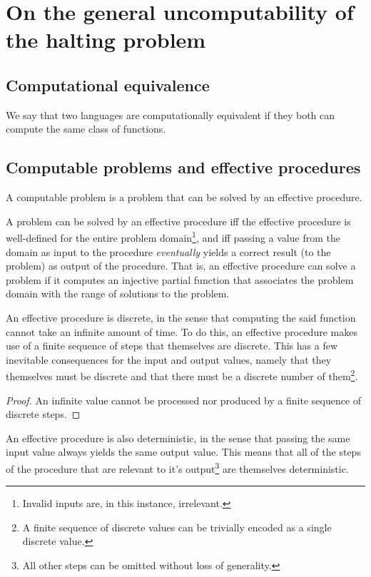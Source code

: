\chapter{On the general uncomputability of the halting problem}

\section{Computational equivalence}

\begin{definition} We say that two languages are computationally equivalent if
they both can compute the same class of functions.\end{definition}

\section{Computable problems and effective procedures}

A computable problem is a problem that can be solved by an effective procedure.

A problem can be solved by an effective procedure iff the effective procedure
is well-defined for the entire problem domain\footnote{Invalid inputs are, in
this instance, irrelevant.}, and iff passing a value from the domain as input
to the procedure \emph{eventually} yields a correct result (to the problem) as
output of the procedure. That is, an effective procedure can solve a problem if
it computes an injective partial function that associates the problem domain
with the range of solutions to the problem.

An effective procedure is discrete, in the sense that computing the said
function cannot take an infinite amount of time. To do this, an effective
procedure makes use of a finite sequence of steps that themselves are discrete.
This has a few inevitable consequences for the input and output values, namely
that they themselves must be discrete and that there must be a discrete number
of them\footnote{A finite sequence of discrete values can be trivially encoded
as a single discrete value.}.

\begin{proof} An infinite value cannot be processed nor produced by a finite
sequence of discrete steps.\end{proof}

An effective procedure is also deterministic, in the sense that passing the
same input value always yields the same output value. This means that all of
the steps of the procedure that are relevant to it's output\footnote{All other
steps can be omitted without loss of generality.} are themselves deterministic.

